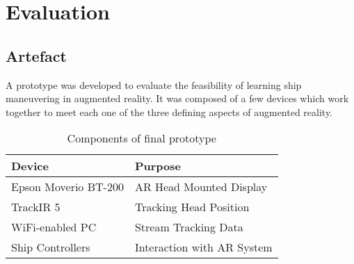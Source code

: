 \chapter{Evaluation}
\section{Artefact}	
A prototype was developed to evaluate the feasibility of learning ship maneuvering in augmented reality. It was  composed of a few devices which work together to meet each one of the three defining aspects of augmented reality. 
\begin{table}[h]
	\centering
\begin{tabular}{L{4.5cm}l@{}}
	\toprule 
	{\textbf{Device}} & {\textbf{Purpose}}\\
	\midrule
	Epson Moverio BT-200 & AR Head Mounted Display \\ 
	TrackIR 5 & Tracking Head Position\\ 
	WiFi-enabled PC & Stream Tracking Data \\
	Ship Controllers & Interaction with AR System \\
	\bottomrule
\end{tabular} 
\caption{Components of final prototype}
\label{tab:componentsprototype}
\end{table}


%
%
%

